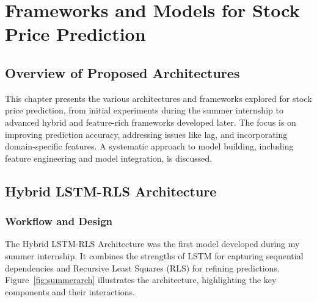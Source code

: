 \chapter{Frameworks and Models for Stock Price Prediction}

\section{Overview of Proposed Architectures}
This chapter presents the various architectures and frameworks explored for stock price prediction, from initial experiments during the summer internship to advanced hybrid and feature-rich frameworks developed later. The focus is on improving prediction accuracy, addressing issues like lag, and incorporating domain-specific features. A systematic approach to model building, including feature engineering and model integration, is discussed.

\section{Hybrid LSTM-RLS Architecture}

\subsection{Workflow and Design}
The Hybrid LSTM-RLS Architecture was the first model developed during my summer internship. It combines the strengths of LSTM for capturing sequential dependencies and Recursive Least Squares (RLS) for refining predictions. Figure~\ref{fig:summerarch} illustrates the architecture, highlighting the key components and their interactions.

